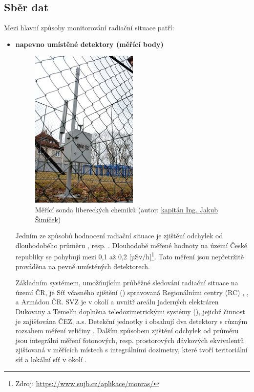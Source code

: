 

\subsection{Sběr dat}	

Mezi hlavní způsoby monitorování radiační situace patří:

\begin{itemize}
\item \textbf{napevno umístěné detektory (měřící body)}
	
\begin{figure}[H]
    \centering
      \includegraphics[width=150pt]{./pictures/03_merici-sonda-v-libereckych-kasarnach_2.jpg}
      \caption[Měřící sonda libereckých chemiků]{Měřící sonda libereckých chemiků
      (autor: \href{http://www.acr.army.cz/informacni-servis/zpravodajstvi/armadni-radiacni-monitorovaci-site-nacvicoval-zasah-pri-radiaci-131355/}{kapitán Ing. Jakub Šimíček})}
      \label{fig:sonda}
\end{figure}
	
Jedním ze způsobů hodnocení radiační situace je zjištění odchylek od
dlouhodobého průměru , resp. . Dlouhodobě měřené
hodnoty  na území České republiky se pohybují mezi 0,1 až 0,2
{[}µSv/h{]}\footnote{Zdroj:
  \url{https://www.sujb.cz/aplikace/monras/}}. Tato měření jsou nepřetržitě
prováděna na pevně umístěných detektorech.
	
Základním systémem, umožňujícím průběžné sledování radiační situace na
území ČR, je Síť včasného zjištění () spravovaná Regionálními
centry (RC) , ,  a Armádou ČR. SVZ je v
okolí a uvnitř areálu jaderných elektráren Dukovany a Temelín doplněna
teledozimetrickými systémy (), jejichž činnost je zajišťována
ČEZ, a.s. Detekční jednotky  i  obsahují dva detektory
s různým rozsahem měření veličiny . Dalším způsobem zjištění
odchylek od průměru jsou integrální měření fotonových,
resp. prostorových dávkových ekvivalentů zjišťovaná v měřících místech
s integrálními dozimetry, které tvoří teritoriální síť a lokální síť v
okolí .
	

\end{itemize}
